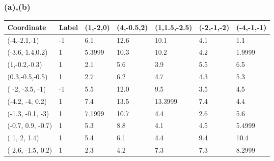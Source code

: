 \documentclass[12pt]{article}
\begin{document}
\subsubsection*{(a),(b)}
\begin{table}[h!]
\begin{tabular}{lllllll}
\hline
Coordinate           & Label & (1,-2,0)                    & (4,-0.5,2)                  & (1,1.5,-2.5)                & (-2,-1,-2)                  & (-4,-1,-1)                     \\ \hline
(-4,-2.1,-1)         & -1    & 6.1                         & 12.6                        & 10.1                        & \cellcolor[HTML]{FFCC67}4.1                         & \cellcolor[HTML]{FFFE65}1.1    \\
(-3.6,-1.4,0.2)      & 1     & 5.3999                      & 10.3                        & 10.2                        & 4.2 & \cellcolor[HTML]{FFFE65}1.9999 \\
(1,-0.2,-0.3)        & 1     & \cellcolor[HTML]{FFFE65}2.1 & 5.6                         & \cellcolor[HTML]{FFFE65}3.9 & 5.5                         & 6.5                            \\
(0.3,-0.5,-0.5)      & 1     & \cellcolor[HTML]{FFCC67}2.7 & 6.2                         & 4.7                         & 4.3                         & 5.3                            \\
( -2, -3.5, -1)      & -1    & 5.5                         & 12.0                        & 9.5                         & \cellcolor[HTML]{FFFE65}3.5 & 4.5                            \\
(-4.2, -4, 0.2)      & 1     & 7.4                         & 13.5                        & 13.3999                     & 7.4                         & \cellcolor[HTML]{FFCC67}4.4    \\
(-1.3, -0.1, -3)     & 1     & 7.1999                      & 10.7                        & 4.4                         & \cellcolor[HTML]{FFFE65}2.6 & 5.6                            \\
(-0.7, 0.9, -0.7)    & 1     & 5.3                         & 8.8                         & \cellcolor[HTML]{FFCC67}4.1 & 4.5                         & 5.4999                         \\
( 1, 2, 1.4)         & 1     & 5.4                         & 6.1                         & 4.4                         & 9.4                         & 10.4                           \\
( 2.6, -1.5, 0.2)    & 1     & \cellcolor[HTML]{FFFE65}2.3 & 4.2                         & 7.3                         & 7.3                         & 8.2999                         \\

\end{tabular}
\end{table}
\end{document}
